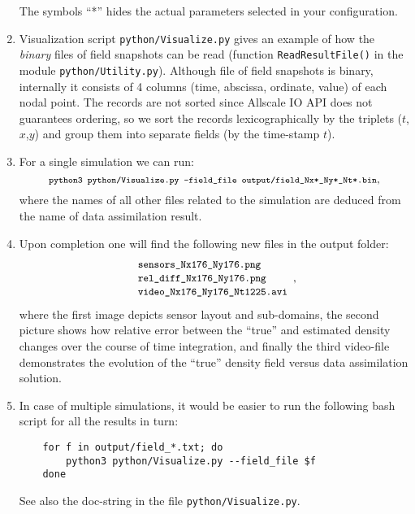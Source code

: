 \documentclass[]{article}
\begin{document}
\begin{enumerate}
The symbols ``*'' hides the actual parameters selected in your configuration.
\item Visualization script \texttt{python/Visualize.py} gives an example of how the \textit{binary} files of field snapshots can be read (function \texttt{ReadResultFile()} in the module \texttt{python/Utility.py}). Although file of field snapshots is binary, internally it consists of 4 columns (time, abscissa, ordinate, value) of each nodal point. The records are not sorted since Allscale IO API does not guarantees ordering, so we sort the records lexicographically by the triplets ($t$,$x$,$y$) and group them into separate fields (by the time-stamp $t$).
\item For a single simulation we can run:
$$
\mbox{\footnotesize\texttt{python3 python/Visualize.py --field\_file  output/field\_Nx*\_Ny*\_Nt*.bin}},
$$
where the names of all other files related to the simulation are deduced from the name of data assimilation result.
\item Upon completion one will find the following new files in the output folder:
$$
\begin{array}{l}
\mbox{\small\texttt{sensors\_Nx176\_Ny176.png}} \\
\mbox{\small\texttt{rel\_diff\_Nx176\_Ny176.png}} \\
\mbox{\small\texttt{video\_Nx176\_Ny176\_Nt1225.avi}}
\end{array},
$$
where the first image depicts sensor layout and sub-domains, the second picture shows how relative error between the ``true'' and estimated density changes over the course of time integration, and finally the third video-file demonstrates the evolution of the ``true'' density field versus data assimilation solution.
\item In case of multiple simulations, it would be easier to run the following bash script for all the results in turn:
\begin{verbatim}
    for f in output/field_*.txt; do
        python3 python/Visualize.py --field_file $f
    done
\end{verbatim}
See also the doc-string in the file \texttt{python/Visualize.py}.
\end{enumerate}
\end{document}
